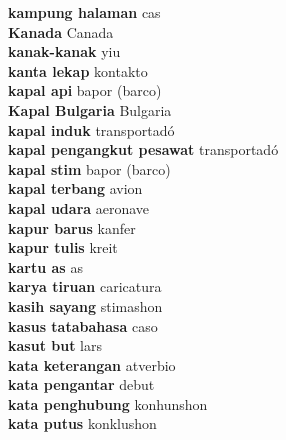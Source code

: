 \textbf{ kampung halaman  } cas \\
\textbf{ Kanada  } Canada \\
\textbf{ kanak-kanak  } yiu \\
\textbf{ kanta lekap  } kontakto \\
\textbf{ kapal api  } bapor (barco) \\
\textbf{ Kapal Bulgaria  } Bulgaria \\
\textbf{ kapal induk  } transportadó \\
\textbf{ kapal pengangkut pesawat  } transportadó \\
\textbf{ kapal stim  } bapor (barco) \\
\textbf{ kapal terbang  } avion \\
\textbf{ kapal udara  } aeronave \\
\textbf{ kapur barus  } kanfer \\
\textbf{ kapur tulis  } kreit \\
\textbf{ kartu as  } as \\
\textbf{ karya tiruan  } caricatura \\
\textbf{ kasih sayang  } stimashon \\
\textbf{ kasus tatabahasa  } caso \\
\textbf{ kasut but  } lars \\
\textbf{ kata keterangan  } atverbio \\
\textbf{ kata pengantar  } debut \\
\textbf{ kata penghubung  } konhunshon \\
\textbf{ kata putus  } konklushon \\

